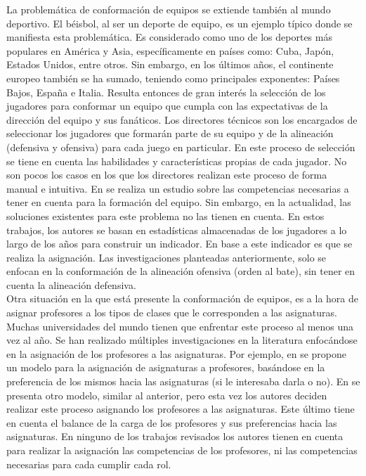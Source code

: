 La problemática de conformación de equipos se extiende también al mundo deportivo. El béisbol, al ser un deporte de equipo, es un ejemplo típico donde se manifiesta esta problemática. Es considerado como uno de los deportes más populares en América y Asia, específicamente en países como: Cuba, Japón, Estados Unidos, entre otros. Sin embargo, en los últimos años, el continente europeo también se ha sumado, teniendo como principales exponentes: Países Bajos, España e Italia. Resulta entonces de gran interés la selección de los jugadores para conformar un equipo que cumpla con las expectativas de la dirección del equipo y sus fanáticos. Los directores técnicos son los encargados de seleccionar los jugadores que formarán parte de su equipo y de la alineación (defensiva y ofensiva) para cada juego en particular. En este proceso de selección se tiene en cuenta las habilidades y características propias de cada jugador. No son pocos los casos en los que los directores realizan este proceso de forma manual e intuitiva. En \cite{Smith1995} se realiza un estudio sobre las competencias necesarias a tener en cuenta para la formación del equipo. Sin embargo, en la actualidad, las soluciones existentes para este problema \citep{Polyashuk2015, Sugrue2007} no las tienen en cuenta. En estos trabajos, los autores se basan en estadísticas almacenadas de los jugadores a lo largo de los años para construir un indicador. En base a este indicador es que se realiza la asignación. Las investigaciones planteadas anteriormente, solo se enfocan en la conformación de la alineación ofensiva (orden al bate), sin tener en cuenta la alineación defensiva.  \\

Otra situación en la que está presente la conformación de equipos, es a la hora de asignar profesores a los tipos de clases que le corresponden a las asignaturas. Muchas universidades del mundo tienen que enfrentar este proceso al menos una vez al año. Se han realizado múltiples investigaciones en la literatura enfocándose en la asignación de los profesores a las asignaturas. Por ejemplo, en \cite{Bosquez2020} se propone un modelo para la asignación de asignaturas a profesores, basándose en la preferencia de los mismos hacia las asignaturas (si le interesaba darla o no). En \cite{Domenech2014} se presenta otro modelo, similar al anterior, pero esta vez los autores deciden realizar este proceso asignando los profesores a las asignaturas. Este último tiene en cuenta el balance de la carga de los profesores y sus preferencias hacia las asignaturas. En ninguno de los trabajos revisados los autores tienen en cuenta para realizar la asignación las competencias de los profesores, ni las competencias necesarias para cada cumplir cada rol.\\

